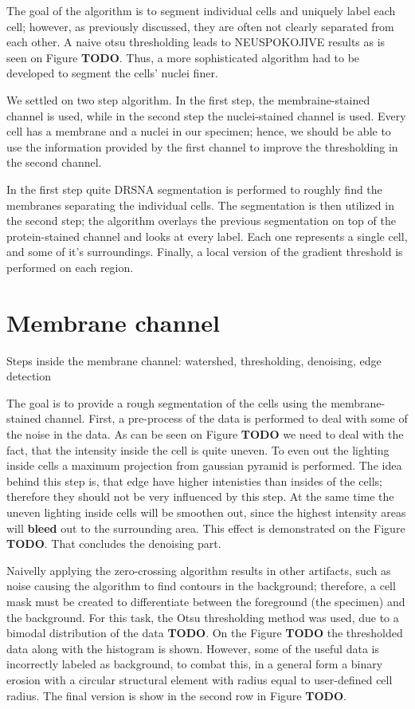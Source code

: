 \documentclass[
  digital,     %
  oneside,     %
  nosansbold,  %
  nocolorbold, %
  lof,         %
  lot,         %
]{fithesis4}
\begin{document}

The goal of the algorithm is to segment individual cells and uniquely label each
cell; however, as previously discussed, they are often not clearly separated
from each other. A naive otsu thresholding leads to NEUSPOKOJIVE results as is
seen on Figure \textbf{TODO}. Thus, a more sophisticated algorithm had to be
developed to segment the cells' nuclei finer.

We settled on two step algorithm. In the first step, the membraine-stained
channel is used, while in the second step the nuclei-stained channel is used.
Every cell has a membrane and a nuclei in our specimen; hence, we should be able
to use the information provided by the first channel to improve the thresholding
in the second channel.

In the first step quite DRSNA segmentation is performed to roughly find the
membranes separating the individual cells. The segmentation is then utilized in
the second step; the algorithm overlays the previous segmentation on top of the
protein-stained channel and looks at every label. Each one represents a single
cell, and some of it's surroundings. Finally, a local version of the gradient 
threshold is performed on each region.

\section{Membrane channel}
Steps inside the membrane channel: watershed, thresholding, denoising, edge
detection

The goal is to provide a rough segmentation of the cells using the
membrane-stained channel. First, a pre-process of the data is performed to deal
with some of the noise in the data. As can be seen on Figure \textbf{TODO} we
need to deal with the fact, that the intensity inside the cell is quite uneven.
To even out the lighting inside cells a maximum projection from gaussian pyramid
is performed. The idea behind this step is, that edge have higher intenisties
than insides of the cells; therefore they should not be very influenced by this
step. At the same time the uneven lighting inside cells will be smoothen out,
since the highest intensity areas will \textbf{bleed} out to the surrounding
area. This effect is demonstrated on the Figure \textbf{TODO}. That concludes
the denoising part.

Naivelly applying the zero-crossing algorithm results in other artifacts, such
as noise causing the algorithm to find contours in the background; therefore,
a cell mask must be created to differentiate between the foreground (the
specimen) and the background. For this task, the Otsu thresholding method was
used, due to a bimodal distribution of the data \textbf{TODO}. On the Figure
\textbf{TODO} the thresholded data along with the histogram is shown. However,
some of the useful data is incorrectly labeled as background, to combat this, in
a general form a binary erosion with a circular structural element with radius
equal to user-defined cell radius. The final version is show in the second row
in Figure \textbf{TODO}.
\end{document}

